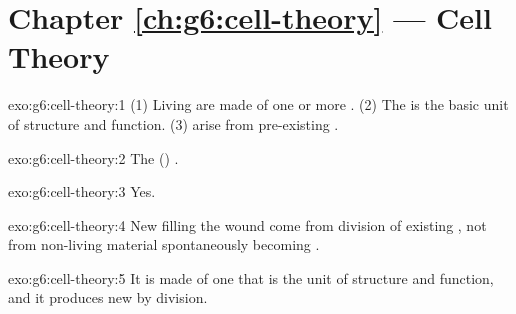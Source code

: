 \section*{Chapter \ref{ch:g6:cell-theory} --- Cell Theory}

\begin{solution}{exo:g6:cell-theory:1}
(1) Living  are made of one or more . (2) The  is the
basic unit of structure and function. (3)  arise from pre-existing
.
\end{solution}

\begin{solution}{exo:g6:cell-theory:2}
The () .
\end{solution}

\begin{solution}{exo:g6:cell-theory:3}
Yes.
\end{solution}

\begin{solution}{exo:g6:cell-theory:4}
New  filling the wound come from division of existing , not
from non-living material spontaneously becoming .
\end{solution}

\begin{solution}{exo:g6:cell-theory:5}
It is made of one  that is the unit of structure and function, and
it produces new  by division.
\end{solution}

